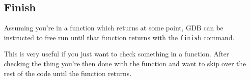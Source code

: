 \subsection{Finish}
Assuming you're in a function which returns at some point, GDB can be instructed to free run until that function returns with the \texttt{finish} command.

This is very useful if you just want to check something in a function. After checking the thing you're then done with the function and want to skip over the rest of the code until the function returns. 


